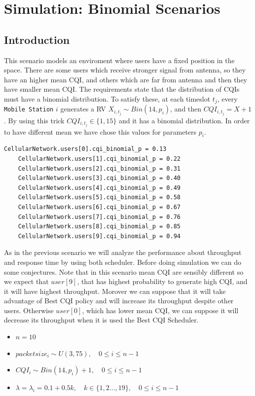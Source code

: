 \chapter{Simulation: Binomial Scenarios}
\section{Introduction}
This scenario models an enviroment where users have a fixed position in the space. There are some users which receive stronger signal from antenna, so they have an higher mean CQI, and others which are far from antenna and then they have smaller mean CQI. The requirements state that the distribution of CQIs must have a binomial distribution. To satisfy these, at each timeslot \(t_{j}\), every \texttt{Mobile Station} \(i\) generates a RV \(X_{i,t_{j}} \sim Bin(14,p_{i})\), and then \(CQI_{i,t_{j}} = X + 1\). By using this trick \(CQI_{i,t_{j}} \in \{1,15\}\) and it has a binomial distribution. In order to have different mean we have chose this values for parameters \(p_{i}\).
\begin{lstlisting}[caption={omnet.ini - p parameters}]
	CellularNetwork.users[0].cqi_binomial_p = 0.13
	CellularNetwork.users[1].cqi_binomial_p = 0.22
	CellularNetwork.users[2].cqi_binomial_p = 0.31
	CellularNetwork.users[3].cqi_binomial_p = 0.40
	CellularNetwork.users[4].cqi_binomial_p = 0.49
	CellularNetwork.users[5].cqi_binomial_p = 0.58
	CellularNetwork.users[6].cqi_binomial_p = 0.67
	CellularNetwork.users[7].cqi_binomial_p = 0.76
	CellularNetwork.users[8].cqi_binomial_p = 0.85
	CellularNetwork.users[9].cqi_binomial_p = 0.94
\end{lstlisting}
As in the previous scenario we will analyze the performance about throughput and response time by using both scheduler. Before doing simulation we can do some conjectures. Note that in this scenario mean CQI are sensibly different so we expect that \(user[9]\), that has highest probability to generate high CQI, and it will have highest throughput. Morover we can suppose that it will take advantage of Best CQI policy and will increase its throughput despite other users. Otherwise \(user[0]\), which has lower mean CQI, we can suppose it will decrease its throughput when it is used the Best CQI Scheduler.

\begin{itemize}
	\item \(n=10\)
	\item \(packetsize_{i} \sim U(3,75), \quad 0 \le i \le n-1\)
	\item \(CQI_{i} \sim Bin(14,p_{i})+1, \quad 0 \le i \le n-1\)
	\item \( \lambda = \lambda_{i} = 0.1 + 0.5k, \quad k\in\{1,2\ldots,19\}, \quad 0 \le i \le n-1\)
\end{itemize}

